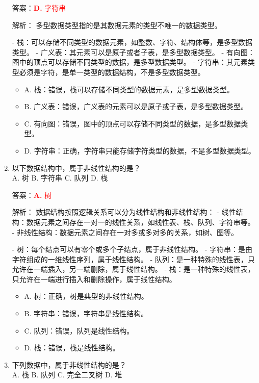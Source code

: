 \documentclass[lang=cn,newtx,10pt,scheme=chinese]{../../../elegantbook}
\begin{document}
\begin{enumerate}
    答案：\textcolor{red}{\textbf{D.} 字符串}

    解析：
    多型数据类型指的是其数据元素的类型不唯一的数据类型。
    
    - 栈：可以存储不同类型的数据元素，如整数、字符、结构体等，是多型数据类型。
    - 广义表：其元素可以是原子或者子表，是多型数据类型。
    - 有向图：图中的顶点可以存储不同类型的数据，是多型数据类型。
    - 字符串：其元素类型必须是字符，是单一类型的数据结构，不是多型数据类型。

    \begin{itemize}
        \item A. 栈：错误，栈可以存储不同类型的数据元素，是多型数据类型。
        \item B. 广义表：错误，广义表的元素可以是原子或子表，是多型数据类型。
        \item C. 有向图：错误，图中的顶点可以存储不同类型的数据，是多型数据类型。
        \item D. 字符串：正确，字符串只能存储字符类型的数据，不是多型数据类型。
    \end{itemize}

    \item 以下数据结构中，属于非线性结构的是？\\
    A. 树 \quad B. 字符串 \quad C. 队列 \quad D. 栈

    答案：\textcolor{red}{\textbf{A.} 树}

    解析：
    数据结构按照逻辑关系可以分为线性结构和非线性结构：
    - 线性结构：数据元素之间存在一对一的线性关系，如线性表、栈、队列、字符串等。
    - 非线性结构：数据元素之间存在一对多或多对多的关系，如树、图等。
    
    - 树：每个结点可以有零个或多个子结点，属于非线性结构。
    - 字符串：是由字符组成的一维线性序列，属于线性结构。
    - 队列：是一种特殊的线性表，只允许在一端插入，另一端删除，属于线性结构。
    - 栈：是一种特殊的线性表，只允许在一端进行插入和删除操作，属于线性结构。

    \begin{itemize}
        \item A. 树：正确，树是典型的非线性结构。
        \item B. 字符串：错误，字符串是线性结构。
        \item C. 队列：错误，队列是线性结构。
        \item D. 栈：错误，栈是线性结构。
    \end{itemize}

    \item 下列数据中，属于非线性结构的是？\\
    A. 栈 \quad B. 队列 \quad C. 完全二叉树 \quad D. 堆


\end{enumerate}
\end{document}
